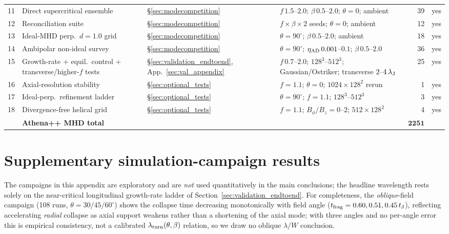 \documentclass[usenatbib,twoside,twocolumn]{mnras}
\begin{document}
\begin{table}
\begin{tabular}{@{}c p{3.4cm} l p{4.0cm} r l@{}}
11 & Direct supercritical ensemble & \S\ref{sec:modecompetition} & $f\,1.5$--$2.0$; $\beta\,0.5$--$2.0$; $\theta=0$; ambient & 39 & yes \\
12 & Reconciliation suite & \S\ref{sec:modecompetition} & $f\times\beta\times2$ seeds; $\theta=0$; ambient & 12 & yes \\
13 & Ideal-MHD perp.\ $d=1.0$ grid & \S\ref{sec:modecompetition} & $\theta=90^\circ$; $\beta\,0.5$--$2.0$; ambient & 18 & yes \\
14 & Ambipolar non-ideal survey & \S\ref{sec:modecompetition} & $\theta=90^\circ$; $\eta_{\rm AD}\,0.001$--$0.1$; $\beta\,0.5$--$2.0$ & 36 & yes \\
15 & Growth-rate + equil.\ control + transverse/higher-$f$ tests & \S\ref{sec:validation_endtoend}, App.~\ref{sec:val_appendix} & $f\,0.7$--$2.0$; $128^3$--$512^3$; Gaussian/Ostriker; transverse $2$--$4\,\lambda_{\rm J}$ & 25 & yes \\
16 & Axial-resolution stability & \S\ref{sec:optional_tests} & $f=1.1$; $\theta=0$; $1024\times128^2$ rerun & 1 & yes \\
17 & Ideal-perp.\ refinement ladder & \S\ref{sec:optional_tests} & $\theta=90^\circ$; $f=1.1$; $128^3$--$512^3$ & 3 & yes \\
18 & Divergence-free helical grid & \S\ref{sec:optional_tests} & $f=1.1$; $B_\phi/B_z=0$--$2$; $512\times128^2$ & 4 & yes \\
\midrule
   & \textbf{Athena++ MHD total} & & & $\boldsymbol{2251}$ & \\
\bottomrule
\end{tabular}
\end{table}

\section{Supplementary simulation-campaign results}
\label{sec:supplementary_campaigns_app}

The campaigns in this appendix are exploratory and are \emph{not} used quantitatively in the main conclusions; the headline wavelength rests solely on the near-critical longitudinal growth-rate ladder of Section~\ref{sec:validation_endtoend}. For completeness, the \emph{oblique}-field campaign (108 runs, $\theta=30/45/60^\circ$) shows the collapse time decreasing monotonically with field angle ($t_{\rm frag}=0.60,0.51,0.45\,t_{\rm J}$), reflecting accelerating \emph{radial} collapse as axial support weakens rather than a shortening of the axial mode; with three angles and no per-angle error this is empirical consistency, not a calibrated $\lambda_{\rm turn}(\theta,\beta)$ relation, so we draw no oblique $\lambda/W$ conclusion.
\end{document}
